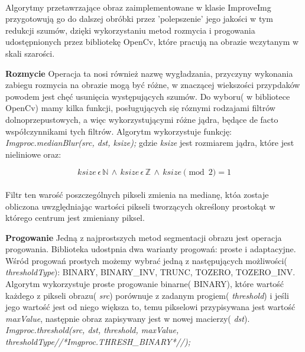 \documentclass[a4paper,12pt]{article}
\begin{document}
			\paragraph{} Algorytmy przetawrzające obraz zaimplementowane w klasie           ImproveImg przygotowują go do dalszej obróbki przez 'polepszenie' jego      jakości w tym redukcji szumów, dzięki wykorzystaniu metod rozmycia i        progowania udostępnionych przez bibliotekę OpenCv, które pracują na         obrazie wczytanym w skali szarości.  \par
			
			    \textbf{Rozmycie}
			    Operacja ta nosi również nazwę wygładzania, przyczyny wykonania zabiegu rozmycia na obrazie mogą być różne, w znaczącej wiekszości przypdaków powodem jest chęć usunięcia występujących szumów. Do wyboru( w bibliotece OpenCv) mamy kilka funkcji, posługujących się róznymi rodzajami filtrów dolnoprzepustowych, a więc wykorzystującymi różne jądra, będące de facto współczynnikami tych filtrów. Algorytm wykorzystuje funkcję:
			    \textit{Imgproc.medianBlur(src, dst, ksize);}
			    gdzie \textit{ksize} jest rozmiarem jądra, które jest nieliniowe oraz:  
			    
			    \begin{displaymath}
                    ksize\, \epsilon\, \mathbb{N}\, \wedge\, ksize\, \epsilon\, \mathbb{Z}\, \wedge\, ksize\pmod{2} = 1
                \end{displaymath}
                
                \paragraph{} Filtr ten warość poszczególnych pikseli zmienia na medianę, któa zostaje obliczona uwzględniając wartości pikseli tworzących określony prostokąt w którego centrum jest zmieniany piksel. \par
			     
			    \textbf{Progowanie}
			    Jedną z najprostszych metod segmentacji obrazu jest operacja progowania.  Biblioteka udostpnia dwa warianty progowań: proste i adaptacyjne. 
			    Wśród progowań prostych możemy wybrać jedną z następujących możliwości( \textit{thresholdType}): BINARY, BINARY\_INV, TRUNC, TOZERO, TOZERO\_INV.
			    Algorytm wykorzystuje proste progowanie binarne( BINARY), które wartość każdego z pikseli obrazu( \textit{src}) porównuje z zadanym progiem( \textit{threshold}) i jeśli jego wartość jest od niego większa to, temu pikselowi przypisywana jest wartość \textit{maxValue}, następnie obraz zapisywany jest w nowej macierzy( \textit{dst}).\\
			    \textit{Imgproc.threshold(src, dst, threshold, maxValue, thresholdType//*Imgproc.THRESH\_BINARY*//);}
			    
\end{document}
